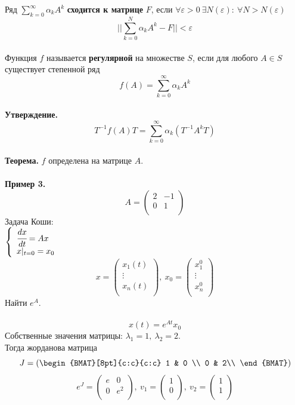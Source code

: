 \documentclass[12pt]{article}
\theoremstyle{definition}
\numberwithin{equation}{section}
\begin{document}
Ряд $\sum\limits_{k=0}^{\infty}\alpha_kA^k$ \textbf{сходится к матрице} $F$, если $\forall \varepsilon >0~\exists N(\varepsilon):~\forall N>N(\varepsilon)$
$$||\sum\limits_{k=0}^N\alpha_kA^k-F||<\varepsilon$$
\\
Функция $f$ называется \textbf{регулярной} на множестве $S$, если для любого $A\in S$ существует степенной ряд $$f(A)=\sum\limits_{k=0}^{\infty}\alpha_kA^k$$
\\
\textbf{Утверждение.} $$T^{-1}f(A)T=\sum\limits_{k=0}^{\infty}\alpha_k(T^{-1}A^kT)$$
\\
\textbf{Теорема.} $f$ определена на матрице $A$.
\\
\\
\textbf{Пример 3.}\\
\[A = \begin{pmatrix}
2 & -1\\
0 & 1\\
\end{pmatrix}\]
Задача Коши:\\
$
\left\{
\begin{array}{lcl}
    \cfrac{dx}{dt}=Ax\\
     x|_{t=0}=x_0\\
\end{array}
\right.
$
\\
\[x = \begin{pmatrix}
x_1(t)\\
\vdots\\
x_n(t)\\
\end{pmatrix},~x_0= \begin{pmatrix}
x_1^0\\
\vdots\\
x_n^0\\
\end{pmatrix}\]
Найти $e^A$.\\
\\
$$x(t)=e^{At}x_0$$
Собственные значения матрицы: $\lambda_1=1,~\lambda_2=2$.\\
Тогда жорданова матрица
\[J= \left(
\begin{BMAT}[8pt]{c:c}{c:c}
  1 & 0 \\
  0 & 2\\
\end{BMAT} \right)
\]
\[e^J = \begin{pmatrix}
e & 0 \\
0 & e^2\\
\end{pmatrix},~v_1=\begin{pmatrix}
1 \\
0 \\
\end{pmatrix},~v_2= \begin{pmatrix}
1 \\
1\\
\end{pmatrix}\]
\end{document}
